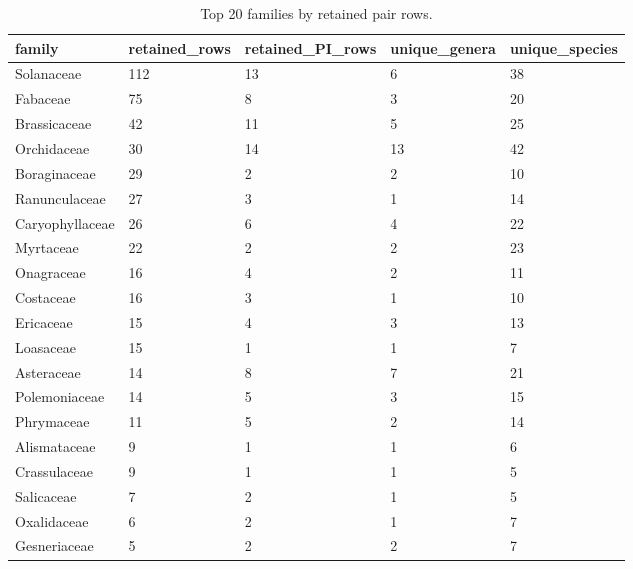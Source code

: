 \begin{table}
\caption{Top 20 families by retained pair rows.}
\label{tab:top20_families}
\begin{adjustbox}{max width=\textwidth}
\begin{tabular}{lllll}
\toprule
family & retained\_rows & retained\_PI\_rows & unique\_genera & unique\_species \\
\midrule
Solanaceae & 112 & 13 & 6 & 38 \\
Fabaceae & 75 & 8 & 3 & 20 \\
Brassicaceae & 42 & 11 & 5 & 25 \\
Orchidaceae & 30 & 14 & 13 & 42 \\
Boraginaceae & 29 & 2 & 2 & 10 \\
Ranunculaceae & 27 & 3 & 1 & 14 \\
Caryophyllaceae & 26 & 6 & 4 & 22 \\
Myrtaceae & 22 & 2 & 2 & 23 \\
Onagraceae & 16 & 4 & 2 & 11 \\
Costaceae & 16 & 3 & 1 & 10 \\
Ericaceae & 15 & 4 & 3 & 13 \\
Loasaceae & 15 & 1 & 1 & 7 \\
Asteraceae & 14 & 8 & 7 & 21 \\
Polemoniaceae & 14 & 5 & 3 & 15 \\
Phrymaceae & 11 & 5 & 2 & 14 \\
Alismataceae & 9 & 1 & 1 & 6 \\
Crassulaceae & 9 & 1 & 1 & 5 \\
Salicaceae & 7 & 2 & 1 & 5 \\
Oxalidaceae & 6 & 2 & 1 & 7 \\
Gesneriaceae & 5 & 2 & 2 & 7 \\
\bottomrule
\end{tabular}
\end{adjustbox}
\end{table}
